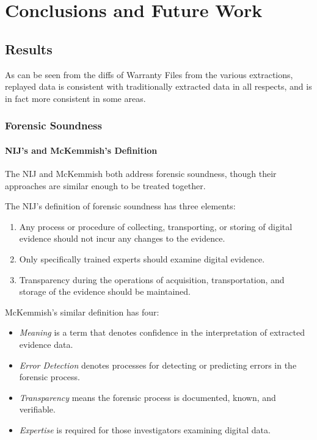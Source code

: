 \chapter{Conclusions and Future Work}

\section{Results}

As can be seen from the diffs of Warranty Files from the various extractions, replayed data is consistent with
traditionally extracted data in all respects, and is in fact more consistent in some areas.

\subsection{Forensic Soundness}

\subsubsection{NIJ's and McKemmish's Definition}

The NIJ and McKemmish both address forensic soundness, though their approaches are similar enough to be
treated together.

The NIJ's definition of forensic soundness has three elements:

\begin{enumerate}
  \item Any process or procedure of collecting, transporting, or storing of digital evidence should not incur any changes to the evidence.
  \item Only specifically trained experts should examine digital evidence.
  \item Transparency during the operations of acquisition, transportation, and storage of the evidence should be maintained.
\end{enumerate}

McKemmish's similar definition has four:

\begin{itemize}
\item \emph{Meaning} is a term that denotes confidence in the interpretation of extracted evidence data.
\item \emph{Error Detection} denotes processes for detecting or predicting errors in the forensic process.
\item \emph{Transparency} means the forensic process is documented, known, and verifiable.
\item \emph{Expertise} is required for those investigators examining digital data.
\end{itemize}

